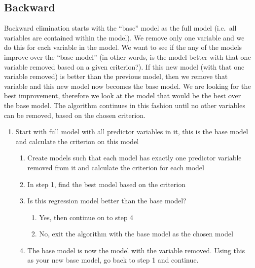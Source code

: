 \documentclass[
  letterpaper,
  DIV=11,
  numbers=noendperiod]{scrreprt}
\providecommand{\tightlist}{%
  \setlength{\itemsep}{0pt}\setlength{\parskip}{0pt}}\usepackage{longtable,booktabs,array}
\begin{document}
\hypertarget{backward}{%
\subsection*{Backward}\label{backward}}

Backward elimination starts with the ``base'' model as the full model
(i.e.~all variables are contained within the model). We remove only one
variable and we do this for each variable in the model. We want to see
if the any of the models improve over the ``base model'' (in other
words, is the model better with that one variable removed based on a
given criterion?). If this new model (with that one variable removed) is
better than the previous model, then we remove that variable and this
new model now becomes the base model. We are looking for the best
improvement, therefore we look at the model that would be the best over
the base model. The algorithm continues in this fashion until no other
variables can be removed, based on the chosen criterion.

\begin{enumerate}
\def\labelenumi{\arabic{enumi}.}
\setcounter{enumi}{-1}
\tightlist
\item
  Start with full model with all predictor variables in it, this is the
  base model and calculate the criterion on this model\\

  \begin{enumerate}
  \def\labelenumii{\arabic{enumii}.}
  \tightlist
  \item
    Create models such that each model has exactly one predictor
    variable removed from it and calculate the criterion for each
    model\\
  \item
    In step 1, find the best model based on the criterion\\
  \item
    Is this regression model better than the base model?\\

    \begin{enumerate}
    \def\labelenumiii{\alph{enumiii}.}
    \tightlist
    \item
      Yes, then continue on to step 4\\
    \item
      No, exit the algorithm with the base model as the chosen model\\
    \end{enumerate}
  \item
    The base model is now the model with the variable removed. Using
    this as your new base model, go back to step 1 and continue.\\
  \end{enumerate}
\end{enumerate}
\end{document}
